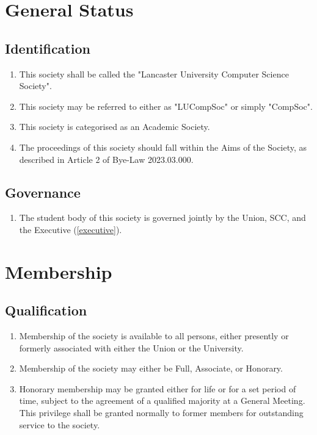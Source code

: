 \documentclass{scrartcl}
\begin{document}
    \clearpage
    \section{General Status}
        \label{general}
        \subsection{Identification}
            \label{general--identification}
            \begin{enumerate}
                \item This society shall be called the "Lancaster University Computer Science Society".
                \item This society may be referred to either as "LUCompSoc" or simply "CompSoc".
                \item This society is categorised as an Academic Society.
                \item The proceedings of this society should fall within the Aims of the Society, as described in Article 2 of Bye-Law 2023.03.000.
            \end{enumerate}

        \subsection{Governance}
            \label{general--governance}
            \begin{enumerate}
                \item The student body of this society is governed jointly by the Union, SCC, and the Executive (\ref{executive}).
            \end{enumerate}

    \clearpage
    \section{Membership}
        \label{membership}
        \subsection{Qualification}
            \label{membership--qualification}
            \begin{enumerate}
                \item Membership of the society is available to all persons, either presently or formerly associated with either the Union or the University.
                \item Membership of the society may either be Full, Associate, or Honorary.
                \item Honorary membership may be granted either for life or for a set period of time, subject to the agreement of a qualified majority at a General Meeting. This privilege shall be granted normally to former members for outstanding service to the society.
            \end{enumerate}
\end{document}
